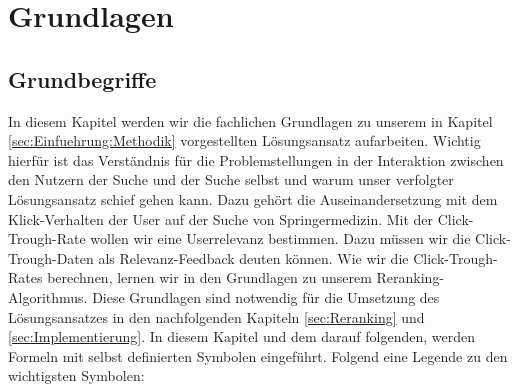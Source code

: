 %
\chapter{Grundlagen}
\label{sec:Grundlagen}


\section{Grundbegriffe}
\label{sec:Grundlagen:Grundbegriffe}

In diesem Kapitel werden wir die fachlichen Grundlagen zu unserem in Kapitel \ref{sec:Einfuehrung:Methodik} vorgestellten Lösungsansatz aufarbeiten. Wichtig hierfür ist das Verständnis für die Problemstellungen in der Interaktion zwischen den Nutzern der Suche und der Suche selbst und warum unser verfolgter Lösungsansatz schief gehen kann. Dazu gehört die Auseinandersetzung mit dem Klick-Verhalten der User auf der Suche von Springermedizin. Mit der Click-Trough-Rate wollen wir eine Userrelevanz bestimmen. Dazu müssen wir die Click-Trough-Daten als Relevanz-Feedback deuten können. Wie wir die Click-Trough-Rates berechnen, lernen wir in den Grundlagen zu unserem Reranking-Algorithmus. Diese Grundlagen sind notwendig für die Umsetzung des Lösungsansatzes in den nachfolgenden Kapiteln \ref{sec:Reranking} und \ref{sec:Implementierung}. In diesem Kapitel und dem darauf folgenden, werden Formeln mit selbst definierten Symbolen eingeführt. Folgend eine Legende zu den wichtigsten Symbolen:

